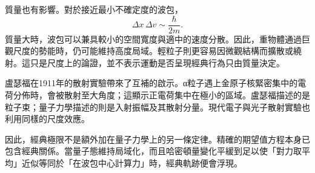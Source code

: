 質量也有影響。對於接近最小不確定度的波包，
\begin{equation}
\Delta x\,\Delta v
\sim
\frac{\hbar}{2m}.
\end{equation}
質量大時，波包可以兼具較小的空間寬度與適中的速度分散。因此，重物體通過巨觀尺度的勢能時，仍可能維持高度局域。輕粒子則更容易因微觀結構而擴散或繞射。這只是尺度上的論證，並不表示運動是否呈現經典行為只由質量決定。

\begin{classroomqa}
\end{classroomqa}

盧瑟福在1911年的散射實驗帶來了互補的啟示。{\proseunicodefont α}粒子遇上金原子核緊密集中的電荷分佈時，會被散射至大角度；這顯示正電荷集中在極小的區域。盧瑟福描述的是粒子束；量子力學描述的則是入射振幅及其散射分量。現代電子與光子散射實驗也利用同樣的尺度效應。

\begin{classroomqa}
\end{classroomqa}

因此，經典極限不是額外加在量子力學上的另一條定律。精確的期望值方程本身已包含經典關係。當量子態維持局域化，而且哈密頓量變化平緩到足以使「對力取平均」近似等同於「在波包中心計算力」時，經典軌跡便會浮現。
